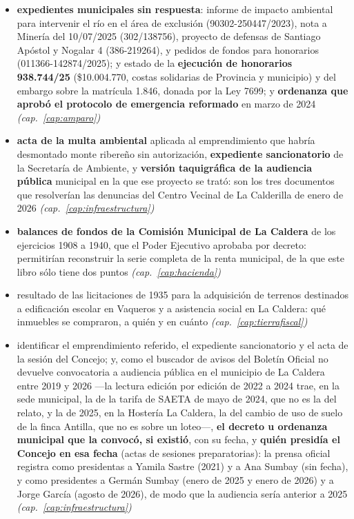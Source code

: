 \begin{itemize}[leftmargin=*]
\item \textbf{expedientes municipales sin respuesta}: informe de impacto ambiental para intervenir el río en el área de exclusión (90302-250447/2023), nota a Minería del 10/07/2025 (302/138756), proyecto de defensas de Santiago Apóstol y Nogalar 4 (386-219264), y pedidos de fondos para honorarios (011366-142874/2025); y estado de la \textbf{ejecución de honorarios 938.744/25} (\$10.004.770, costas solidarias de Provincia y municipio) y del embargo sobre la matrícula 1.846, donada por la Ley 7699; y \textbf{ordenanza que aprobó el protocolo de emergencia reformado} en marzo de 2024 \textit{(cap.\ \ref{cap:amparo})}
\item \textbf{acta de la multa ambiental} aplicada al emprendimiento que habría desmontado monte ribereño sin autorización, \textbf{expediente sancionatorio} de la Secretaría de Ambiente, y \textbf{versión taquigráfica de la audiencia pública} municipal en la que ese proyecto se trató: son los tres documentos que resolverían las denuncias del Centro Vecinal de La Calderilla de enero de 2026 \textit{(cap.\ \ref{cap:infraestructura})}
\item \textbf{balances de fondos de la Comisión Municipal de La Caldera} de los ejercicios 1908 a 1940, que el Poder Ejecutivo aprobaba por decreto: permitirían reconstruir la serie completa de la renta municipal, de la que este libro sólo tiene dos puntos \textit{(cap.\ \ref{cap:hacienda})}
\item resultado de las licitaciones de 1935 para la adquisición de terrenos destinados a edificación escolar en Vaqueros y a asistencia social en La Caldera: qué inmuebles se compraron, a quién y en cuánto \textit{(cap.\ \ref{cap:tierrafiscal})}
\item identificar el emprendimiento referido, el expediente sancionatorio y el acta de la sesión del Concejo; y, como el buscador de avisos del Boletín Oficial no devuelve convocatoria a audiencia pública en el municipio de La Caldera entre 2019 y 2026 ---la lectura edición por edición de 2022 a 2024 trae, en la sede municipal, la de la tarifa de SAETA de mayo de 2024, que no es la del relato, y la de 2025, en la Hostería La Caldera, la del cambio de uso de suelo de la finca Antilla, que no es sobre un loteo---, \textbf{el decreto u ordenanza municipal que la convocó, si existió}, con su fecha, y \textbf{quién presidía el Concejo en esa fecha} (actas de sesiones preparatorias): la prensa oficial registra como presidentas a Yamila Sastre (2021) y a Ana Sumbay (sin fecha), y como presidentes a Germán Sumbay (enero de 2025 y enero de 2026) y a Jorge García (agosto de 2026), de modo que la audiencia sería anterior a 2025 \textit{(cap.\ \ref{cap:infraestructura})}

\end{itemize}
